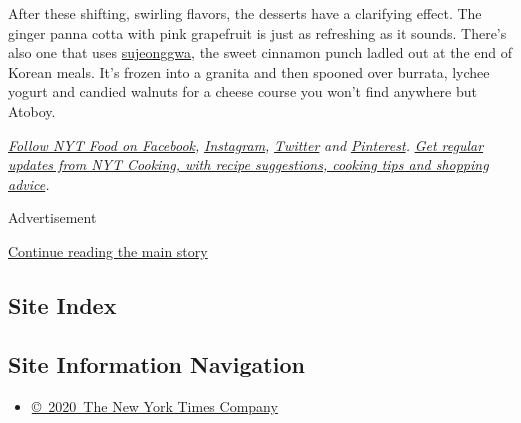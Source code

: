 After these shifting, swirling flavors, the desserts have a clarifying
effect. The ginger panna cotta with pink grapefruit is just as
refreshing as it sounds. There's also one that uses
\href{https://mykoreankitchen.com/sujeonggwa-korean-cinnamon-punch/}{sujeonggwa},
the sweet cinnamon punch ladled out at the end of Korean meals. It's
frozen into a granita and then spooned over burrata, lychee yogurt and
candied walnuts for a cheese course you won't find anywhere but Atoboy.

\href{https://www.facebookcorewwwi.onion/nytfood/}{\emph{Follow NYT Food
on Facebook}}\emph{,}
\href{https://instagram.com/nytfood}{\emph{Instagram}}\emph{,}
\href{https://twitter.com/nytfood}{\emph{Twitter}} \emph{and}
\href{https://www.pinterest.com/nytfood/}{\emph{Pinterest}}\emph{.}
\href{https://www.nytimes3xbfgragh.onion/newsletters/cooking}{\emph{Get
regular updates from NYT Cooking, with recipe suggestions, cooking tips
and shopping advice}}\emph{.}

Advertisement

\protect\hyperlink{after-bottom}{Continue reading the main story}

\hypertarget{site-index}{%
\subsection{Site Index}\label{site-index}}

\hypertarget{site-information-navigation}{%
\subsection{Site Information
Navigation}\label{site-information-navigation}}

\begin{itemize}
\tightlist
\item
  \href{https://help.nytimes3xbfgragh.onion/hc/en-us/articles/115014792127-Copyright-notice}{©~2020~The
  New York Times Company}
\end{itemize}


